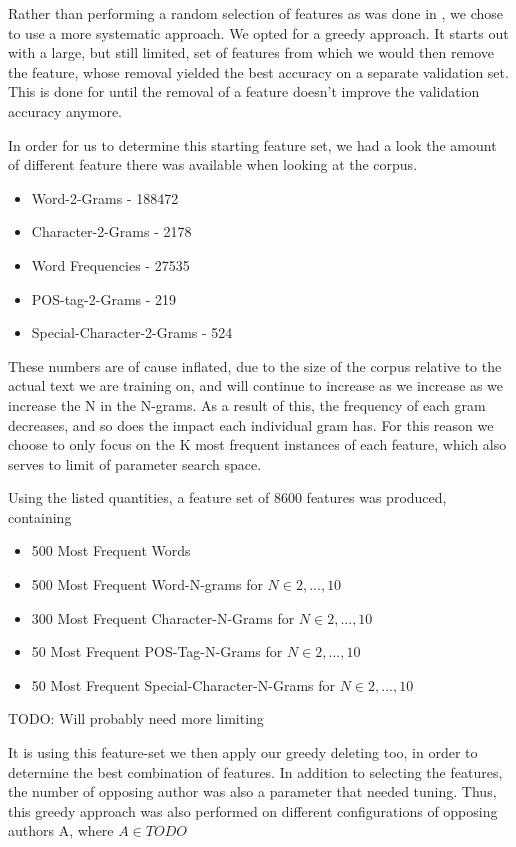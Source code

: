 Rather than performing a random selection of features as was done in \cite{US},
we chose to use a more systematic approach. We opted for a greedy approach. It
starts out with a large, but still limited, set of features from which we would
then remove the feature, whose removal yielded the best accuracy on a separate
validation set. This is done for until the removal of a feature doesn't
improve the validation accuracy anymore.

In order for us to determine this starting feature set, we had a look the
amount of different feature there was available when looking at the corpus.

\begin{itemize}
    \item Word-2-Grams - 188472
    \item Character-2-Grams - 2178
    \item Word Frequencies - 27535
    \item \gls{POS}-tag-2-Grams - 219
    \item Special-Character-2-Grams - 524
\end{itemize}

These numbers are of cause inflated, due to the size of the corpus relative to
the actual text we are training on, and will continue to increase as we increase
as we increase the N in the N-grams. As a result of this, the frequency of each
gram decreases, and so does the impact each individual gram has.
For this reason we choose to only focus on the K most frequent instances of
each feature, which also serves to limit of parameter search space.

Using the listed quantities, a feature set of 8600 features was produced,
containing

\begin{itemize}
    \item 500 Most Frequent Words
    \item 500 Most Frequent Word-N-grams for $N \in {2,...,10}$
    \item 300 Most Frequent Character-N-Grams for $N \in {2,...,10}$
    \item 50 Most Frequent \gls{POS}-Tag-N-Grams for $N \in {2,...,10}$
    \item 50 Most Frequent Special-Character-N-Grams for $N \in {2,...,10}$
\end{itemize}
TODO: Will probably need more limiting 

It is using this feature-set we then apply our greedy deleting too, in order to
determine the best combination of features.
In addition to selecting the features, the number of opposing author was also
a parameter that needed tuning. Thus, this greedy approach was also performed on
different configurations of opposing authors A, where $A \in TODO$



